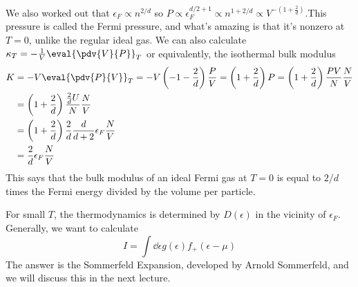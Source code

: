 \documentclass[a4paper,twoside,master.tex]{subfiles}
\begin{document}
We also worked out that $ \epsilon_F \propto n^{2/d} $ so $ P \propto \epsilon_F^{d/2+1} \propto n^{1+2/d} \propto V^{-\left( 1+ \frac{2}{d} \right)} $.This pressure is called the Fermi pressure, and what's amazing is that it's nonzero at $ T=0 $, unlike the regular ideal gas. We can also calculate $ \kappa_T = - \frac{1}{V} \eval{\pdv{V}{P}}_{T} $ or equivalently, the isothermal bulk modulus
\begin{align}
    K &= - V \eval{\pdv{P}{V}}_{T} = - V\left( -1 - \frac{2}{d} \right) \frac{P}{V} = \left( 1 + \frac{2}{d} \right)P = \left( 1 + \frac{2}{d} \right) \frac{PV}{N} \frac{N}{V} \\
    &= \left( 1 + \frac{2}{d} \right) \frac{\frac{2}{d} U}{N} \frac{N}{V} \\
    &= \left( 1 + \frac{2}{d} \right) \frac{2}{d} \frac{d}{d + 2} \epsilon_F \frac{N}{V} \\
    &= \frac{2}{d} \epsilon_F \frac{N}{V}
\end{align}
This says that the bulk modulus of an ideal Fermi gas at $ T = 0 $ is equal to $ 2/d $ times the Fermi energy divided by the volume per particle.


For small $ T $, the thermodynamics is determined by $ D(\epsilon) $ in the vicinity of $ \epsilon_F $. Generally, we want to calculate
\begin{equation}
    I = \int \dd{\epsilon} g(\epsilon) f_+(\epsilon - \mu)
\end{equation}
The answer is the Sommerfeld Expansion, developed by Arnold Sommerfeld, and we will discuss this in the next lecture.
\end{document}
